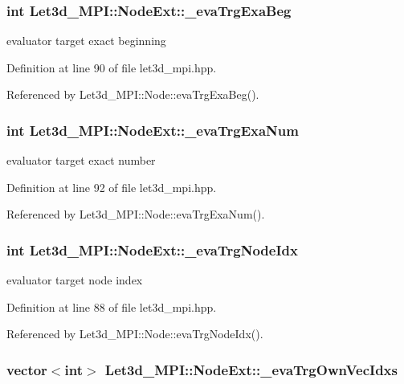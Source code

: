 \subsubsection{\setlength{\rightskip}{0pt plus 5cm}int {\bf Let3d\_\-MPI::Node\-Ext::\_\-eva\-Trg\-Exa\-Beg}}\label{classLet3d__MPI_1_1NodeExt_5f1864b6d4baf6475c7bcfcd2713f8ad_5f1864b6d4baf6475c7bcfcd2713f8ad}


evaluator target exact beginning 

Definition at line 90 of file let3d\_\-mpi.hpp.

Referenced by Let3d\_\-MPI::Node::eva\-Trg\-Exa\-Beg().
\subsubsection{\setlength{\rightskip}{0pt plus 5cm}int {\bf Let3d\_\-MPI::Node\-Ext::\_\-eva\-Trg\-Exa\-Num}}\label{classLet3d__MPI_1_1NodeExt_6363c7dd7705173e46f69db5ea5a1f83_6363c7dd7705173e46f69db5ea5a1f83}


evaluator target exact number 

Definition at line 92 of file let3d\_\-mpi.hpp.

Referenced by Let3d\_\-MPI::Node::eva\-Trg\-Exa\-Num().
\subsubsection{\setlength{\rightskip}{0pt plus 5cm}int {\bf Let3d\_\-MPI::Node\-Ext::\_\-eva\-Trg\-Node\-Idx}}\label{classLet3d__MPI_1_1NodeExt_3dd74cad966a3348bf089a71fddd7ab2_3dd74cad966a3348bf089a71fddd7ab2}


evaluator target node index 

Definition at line 88 of file let3d\_\-mpi.hpp.

Referenced by Let3d\_\-MPI::Node::eva\-Trg\-Node\-Idx().
\subsubsection{\setlength{\rightskip}{0pt plus 5cm}vector$<$int$>$ {\bf Let3d\_\-MPI::Node\-Ext::\_\-eva\-Trg\-Own\-Vec\-Idxs}}\label{classLet3d__MPI_1_1NodeExt_df6a51111033e377fda71567ffb9fda5_df6a51111033e377fda71567ffb9fda5}


